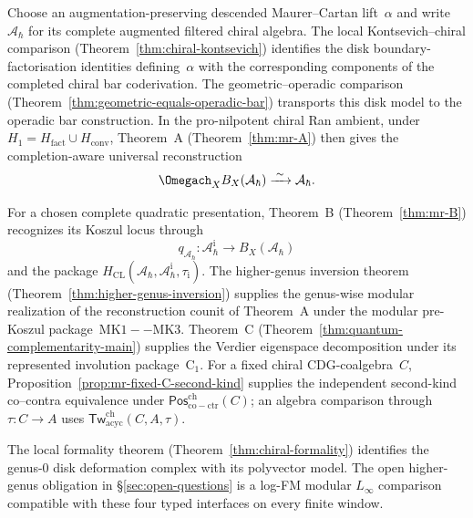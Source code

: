 \begin{remark}
\label{rem:deformation-three-theorems}
Choose an augmentation-preserving descended Maurer--Cartan
lift~\(\alpha\) and write
\(\mathcal A_\hbar\) for its complete augmented filtered chiral
algebra.  The local Kontsevich--chiral comparison
\textup{(}Theorem~\ref{thm:chiral-kontsevich}\textup{)} identifies the
disk boundary-factorisation identities defining~\(\alpha\) with the
corresponding components of the completed chiral bar coderivation.
The geometric--operadic comparison
\textup{(}Theorem~\ref{thm:geometric-equals-operadic-bar}\textup{)}
transports this disk model to the operadic bar construction.  In the
pro-nilpotent chiral Ran ambient, under
\(H_1=H_{\mathrm{fact}}\cup H_{\mathrm{conv}}\), Theorem~A
\textup{(}Theorem~\ref{thm:mr-A}\textup{)} then
gives the completion-aware universal reconstruction
\[
 \Omegach_X B_X(\mathcal A_\hbar)
 \xrightarrow{\;\sim\;}\mathcal A_\hbar.
\]

For a chosen complete quadratic presentation, Theorem~B
\textup{(}Theorem~\ref{thm:mr-B}\textup{)} recognizes its Koszul locus
through
\[
 q_{\mathcal A_\hbar}\colon
 \mathcal A_\hbar^{\mathrm i}\longrightarrow B_X(\mathcal A_\hbar)
\]
and the package
\(H_{\mathrm{CL}}(\mathcal A_\hbar,
\mathcal A_\hbar^{\mathrm i},\tau_{\mathrm i})\).
The higher-genus inversion theorem
\textup{(}Theorem~\ref{thm:higher-genus-inversion}\textup{)} supplies
the genus-wise modular realization of the reconstruction counit of
Theorem~A under the modular pre-Koszul package~\(\mathrm{MK1--MK3}\).
Theorem~C
\textup{(}Theorem~\ref{thm:quantum-complementarity-main}\textup{)}
supplies the Verdier eigenspace decomposition under its represented
involution package~\(\mathrm C_1\).  For a fixed chiral
CDG-coalgebra~\(C\), Proposition~\ref{prop:mr-fixed-C-second-kind}
supplies the independent second-kind co--contra equivalence under
\(\mathsf{Pos}^{\mathrm{ch}}_{\mathrm{co-ctr}}(C)\); an algebra
comparison through~\(\tau\colon C\to A\) uses
\(\mathsf{Tw}^{\mathrm{ch}}_{\mathrm{acyc}}(C,A,\tau)\).

The local formality theorem \textup{(}Theorem~\ref{thm:chiral-formality}\textup{)}
identifies the genus-$0$ disk deformation complex with its polyvector
model.  The open higher-genus obligation in
\S\ref{sec:open-questions} is a log-FM modular \(L_\infty\)
comparison compatible with these four typed interfaces on every
finite window.
\end{remark}

